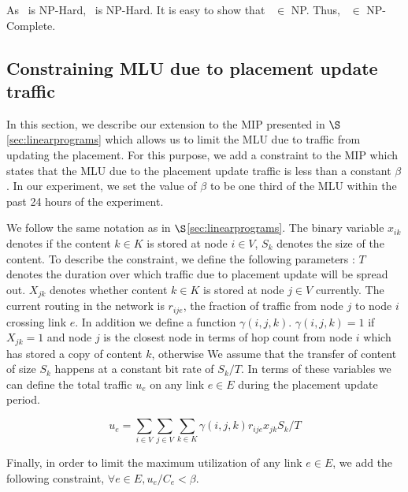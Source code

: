 {As \subsetsum\ is NP-Hard, \optloc\ is NP-Hard. It is easy to show that \optloc\ $\in$ NP. Thus, \optloc\ $\in$ NP-Complete.


\subsection{Constraining MLU due to  placement update traffic}

In this section, we describe our extension to the MIP presented in $\S$\ref{sec:linearprograms} which allows us to limit the MLU due to traffic from updating the placement. For this purpose, we add a constraint to the MIP which states that the MLU due to the placement update traffic is less than a constant $\beta$. In our experiment, we set the value of $\beta$ to be one third of the MLU within the past 24 hours of the experiment. 

We follow the same notation as in $\S$\ref{sec:linearprograms}. The binary variable $x_{ik}$ denotes if the content $k \in K$ is stored at node $i \in V$, $S_k$  denotes the size of the content.  
To describe the constraint, we  define the following parameters :  $T$ denotes the duration over which traffic due to placement update will be spread out.   $X_{jk}$ denotes whether content $k \in K$ is stored at node $j \in V$ currently. The current routing in the network is $r_{ije}$,  the fraction of traffic  from node $j$ to node $i$ crossing link $e$.  In addition we define a function  $\gamma(i, j, k)$.  $\gamma(i, j, k) = 1$  if $X_{jk} = 1$ and node $j$ is the closest node in terms of hop count from node $i$ which has stored a copy of content $k$, otherwise  We assume that the transfer of content of size $S_k$ happens at a constant bit rate of $S_k/T$. In terms of these variables we can define the total traffic  $u_e $ on any link $e \in E$ during the placement update period. 

\[u_e = \sum_{i \in V}  \sum_{j \in V}  \sum_{k \in K}  \gamma(i, j, k) r_{ije}  x_{jk} S_k / T \]

Finally, in order to limit the maximum utilization of any link $e \in E$, we add the following constraint, $\forall e \in E, u_e /C_e < \beta$.



}

